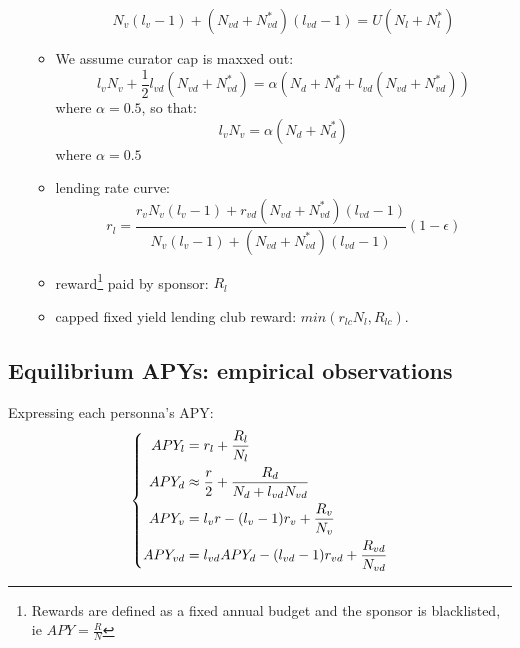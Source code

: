 \documentclass{article}
\begin{document}
\begin{itemize}
\begin{itemize}
            \begin{equation}
                 N_{v}(l_{v}-1) + (N_{vd}+N_{vd}^*)(l_{vd}-1) = U(N_l+N_l^*)
            \end{equation}
            \item We assume curator cap is maxxed out: 
            \begin{equation*}    
                 l_v N_v + \frac{1}{2} l_{vd} (N_{vd}+N_{vd}^*) =
                  \alpha( N_d + N_d^* +  l_{vd} (N_{vd}+N_{vd}^*))
            \end{equation*} where $\alpha=0.5$, so that:
            \begin{equation}    
                l_v N_v = \alpha( N_d + N_d^*)
           \end{equation} where $\alpha=0.5$
            \item lending rate curve: 
            \begin{equation}
                r_l = \frac{r_v N_v(l_v-1)+r_{vd} (N_{vd}+N_{vd}^*)(l_{vd}-1)}{N_v(l_v-1)+(N_{vd}+N_{vd}^*)(l_{vd}-1)}(1-\epsilon)
            \end{equation}
            \item reward\footnote{Rewards are defined as a fixed annual budget and the sponsor is blacklisted, ie $APY = \frac{R}{N}$} paid by sponsor: $R_l$
            \item capped fixed yield lending club reward: $min(r_{lc} N_l, R_{lc})$.
        \end{itemize}
        
    \end{itemize}

    
\subsection{Equilibrium APYs: empirical observations}
    Expressing each personna's APY:
    \begin{equation}
    \left\{
    \begin{aligned}
        APY_l &= r_l + \frac{R_l}{N_l}\\
        APY_d &\approx \frac{r}{2}+\frac{R_d}{N_d+l_{vd}N_{vd}}\\
        APY_v &= l_v \space r - (l_v-1)r_v + \frac{R_v}{N_v}\\
        APY_{vd} &= l_{vd} APY_d - (l_{vd}-1)r_{vd} + \frac{R_{vd}}{N_{vd}}
    \end{aligned}
    \right.
    \end{equation}
    
\end{document}
